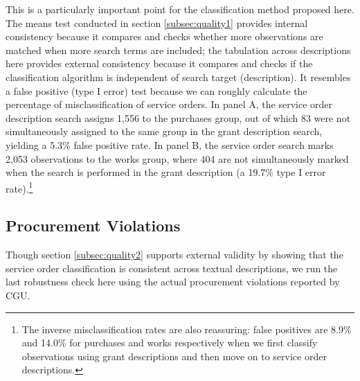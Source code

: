 \documentclass[11pt]{article}
\begin{document}
This is a particularly important point for the classification method proposed here. The means test conducted in section \ref{subsec:quality1} provides internal consistency because it compares and checks whether more observations are matched when more search terms are included; the tabulation across descriptions here provides external consistency because it compares and checks if the classification algorithm is independent of search target (description). It resembles a false positive (type I error) test because we can roughly calculate the percentage of misclassification of service orders. In panel A, the service order description search assigns 1,556 to the purchases group, out of which 83 were not simultaneously assigned to the same group in the grant description search, yielding a 5.3\% false positive rate. In panel B, the service order search marks 2,053 observations to the works group, where 404 are not simultaneously marked when the search is performed in the grant description (a 19.7\% type I error rate).\footnote{The inverse misclassification rates are also reassuring: false positives are 8.9\% and 14.0\% for purchases and works respectively when we first classify observations using grant descriptions and then move on to service order descriptions.}

\subsection{Procurement Violations}\label{subsec:quality3}

Though section \ref{subsec:quality2} supports external validity by showing that the service order classification is consistent across textual descriptions, we run the last robustness check here using the actual procurement violations reported by CGU.
\end{document}
